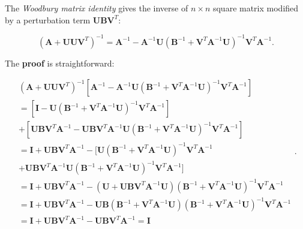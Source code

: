 \documentclass[10pt,b5paper,titlepage]{book}
\begin{document}
The \textit{Woodbury matrix identity} gives the inverse of $n \times n$ square
matrix modified by a perturbation term $\mathbf{U}\mathbf{B}\mathbf{V}^{T}$:

\begin{equation}
    (\mathbf{A} + \mathbf{U}\mathbf{U}\mathbf{V}^{T})^{-1}
    = \mathbf{A}^{-1} - \mathbf{A}^{-1}\mathbf{U}
    (\mathbf{B}^{-1} + \mathbf{V}^{T}\mathbf{A}^{-1}\mathbf{U})^{-1}
    \mathbf{V}^{T}\mathbf{A}^{-1}
.\end{equation}

The \textbf{proof} is straightforward:

\begin{equation}
    \begin{array}{l}
        (\mathbf{A} + \mathbf{U}\mathbf{U}\mathbf{V}^{T})^{-1}
        [\mathbf{A}^{-1} - \mathbf{A}^{-1}\mathbf{U}
        (\mathbf{B}^{-1} + \mathbf{V}^{T}\mathbf{A}^{-1}\mathbf{U})^{-1}
        \mathbf{V}^{T}\mathbf{A}^{-1}] \\
        = [\mathbf{I}
        - \mathbf{U}(\mathbf{B}^{-1}
        + \mathbf{V}^{T}\mathbf{A}^{-1}\mathbf{U})^{-1}\mathbf{V}^{T}\mathbf{A}^{-1}]\\
        + [\mathbf{U}\mathbf{B}\mathbf{V}^{T}\mathbf{A}^{-1}
        - \mathbf{U}\mathbf{B}\mathbf{V}^{T}\mathbf{A}^{-1}\mathbf{U}
        (\mathbf{B}^{-1} + \mathbf{V}^{T}\mathbf{A}^{-1}\mathbf{U})^{-1}
        \mathbf{V}^{T}\mathbf{A}^{-1}]\\
        = \mathbf{I} + \mathbf{U}\mathbf{B}\mathbf{V}^{T}\mathbf{A}^{-1}
        - [\mathbf{U}(\mathbf{B}^{-1} + \mathbf{V}^{T}\mathbf{A}^{-1}\mathbf{U})^{-1}
        \mathbf{V}^{T}\mathbf{A}^{-1}\\
        + \mathbf{U}\mathbf{B}\mathbf{V}^{T}\mathbf{A}^{-1}\mathbf{U}
        (\mathbf{B}^{-1} + \mathbf{V}^{T}\mathbf{A}^{-1}\mathbf{U})^{-1}
        \mathbf{V}^{T}\mathbf{A}^{-1}]\\
        = \mathbf{I} + \mathbf{U}\mathbf{B}\mathbf{V}^{T}\mathbf{A}^{-1}
        - (\mathbf{U} + \mathbf{U}\mathbf{B}\mathbf{V}^{T}\mathbf{A}^{-1}\mathbf{U})
        (\mathbf{B}^{-1} + \mathbf{V}^{T}\mathbf{A}^{-1}\mathbf{U})^{-1}
        \mathbf{V}^{T}\mathbf{A}^{-1}\\
        = \mathbf{I} + \mathbf{U}\mathbf{B}\mathbf{V}^{T}\mathbf{A}^{-1}
        - \mathbf{U}\mathbf{B}(\mathbf{B}^{-1} + \mathbf{V}^{T}\mathbf{A}^{-1}\mathbf{U})
        (\mathbf{B}^{-1} + \mathbf{V}^{T}\mathbf{A}^{-1}\mathbf{U})^{-1}
        \mathbf{V}^{T}\mathbf{A}^{-1}\\
        = \mathbf{I} + \mathbf{U}\mathbf{B}\mathbf{V}^{T}\mathbf{A}^{-1}
        - \mathbf{U}\mathbf{B}\mathbf{V}^{T}\mathbf{A}^{-1} = \mathbf{I}
    \end{array}
.\end{equation}
\end{document}
